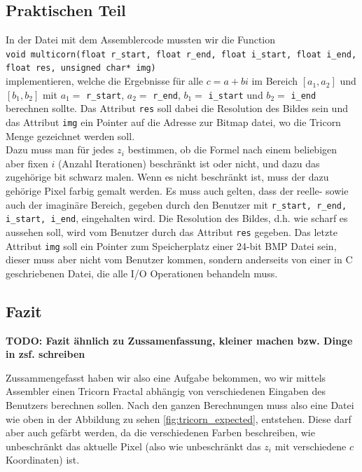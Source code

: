 \documentclass[course=erap]{aspdoc}
\begin{document}
\subsection{Praktischen Teil}\label{problemstellung:praktisch}

In der Datei mit dem Assemblercode mussten wir die Function \\

\lstinline{void multicorn(float r_start, float r_end, float i_start, float i_end, float res, unsigned char* img)} \\

implementieren, welche die Ergebnisse f\"ur alle $c = a + bi$ im Bereich $[a_1, a_2]$ und $[b_1, b_2]$ mit $a_1 = $ \lstinline{r_start}, $a_2 = $ \lstinline{r_end}, $b_1 = $ \lstinline{i_start} und $b_2 = $ \lstinline{i_end} berechnen sollte. Das Attribut \lstinline{res} soll dabei die Resolution des Bildes sein und das Attribut \lstinline{img} ein Pointer auf die Adresse zur Bitmap datei, wo die Tricorn Menge gezeichnet werden soll. \\

Dazu muss man f\"ur jedes $z_i$ bestimmen, ob die Formel nach einem beliebigen aber fixen $i$ (Anzahl Iterationen) beschr\"ankt ist oder nicht, und dazu das zugeh\"orige bit schwarz malen. Wenn es nicht beschr\"ankt ist, muss der dazu geh\"orige Pixel farbig gemalt werden. Es muss auch gelten, dass der reelle- sowie auch der imagin\"are Bereich, gegeben durch den Benutzer mit \lstinline{r_start, r_end, i_start, i_end}, eingehalten wird. Die Resolution des Bildes, d.h. wie scharf es aussehen soll, wird vom Benutzer durch das Attribut \lstinline{res} gegeben. Das letzte Attribut \lstinline{img} soll ein Pointer zum Speicherplatz einer 24-bit BMP Datei sein, dieser muss aber nicht vom Benutzer kommen, sondern anderseits von einer in C geschriebenen Datei, die alle I/O Operationen behandeln muss. \\ 

\subsection{Fazit}

\textbf{TODO: Fazit ähnlich zu Zussamenfassung, kleiner machen bzw. Dinge in zsf. schreiben}

Zussammengefasst haben wir also eine Aufgabe bekommen, wo wir mittels Assembler einen Tricorn Fractal abh\"angig von verschiedenen Eingaben des Benutzers berechnen sollen. Nach den ganzen Berechnungen muss also eine Datei wie oben in der Abbildung zu sehen \ref{fig:tricorn_expected}, entstehen. Diese darf aber auch gef\"arbt werden, da die verschiedenen Farben beschreiben, wie unbeschr\"ankt das aktuelle Pixel (also wie unbeschr\"ankt das $z_i$ mit verschiedene $c$ Koordinaten) ist. 
\end{document}
